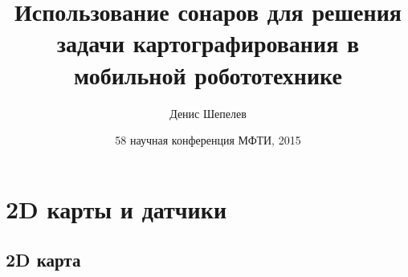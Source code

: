 \documentclass[9pt]{beamer}
\title{Использование сонаров для решения задачи картографирования в мобильной робототехнике}
\author{Денис Шепелев}
\institute[Universities of Somewhere and Elsewhere] %
{
  ИППИ РАН \\ МФТИ
}
\date{58 научная конференция МФТИ, 2015}
\begin{document}
\begin{frame}
  \titlepage
\end{frame}




          


\section{2D карты и датчики}

\subsection{2D карта}
\end{document}
